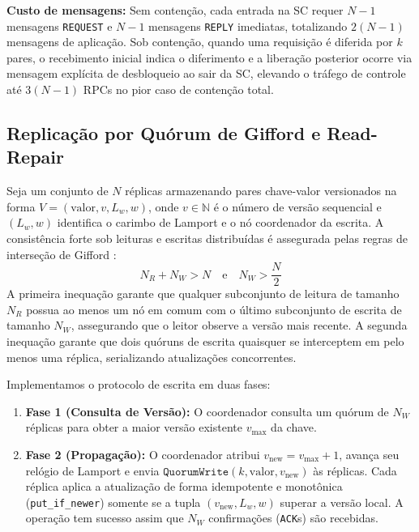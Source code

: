 \documentclass[conference,10pt]{IEEEtran}
\begin{document}
\textbf{Custo de mensagens:} Sem contenção, cada entrada na SC requer $N-1$ mensagens \texttt{REQUEST} e $N-1$ mensagens \texttt{REPLY} imediatas, totalizando $2(N-1)$ mensagens de aplicação. Sob contenção, quando uma requisição é diferida por $k$ pares, o recebimento inicial indica o diferimento e a liberação posterior ocorre via mensagem explícita de desbloqueio ao sair da SC, elevando o tráfego de controle até $3(N-1)$ RPCs no pior caso de contenção total.

\subsection{Replicação por Quórum de Gifford e Read-Repair}

Seja um conjunto de $N$ réplicas armazenando pares chave-valor versionados na forma $V = (\text{valor}, v, L_w, w)$, onde $v \in \mathbb{N}$ é o número de versão sequencial e $(L_w, w)$ identifica o carimbo de Lamport e o nó coordenador da escrita. A consistência forte sob leituras e escritas distribuídas é assegurada pelas regras de interseção de Gifford \cite{gifford1979}:
\begin{equation}
N_R + N_W > N \quad \text{e} \quad N_W > \frac{N}{2}
\label{eq:quorum_rules}
\end{equation}
A primeira inequação garante que qualquer subconjunto de leitura de tamanho $N_R$ possua ao menos um nó em comum com o último subconjunto de escrita de tamanho $N_W$, assegurando que o leitor observe a versão mais recente. A segunda inequação garante que dois quóruns de escrita quaisquer se interceptem em pelo menos uma réplica, serializando atualizações concorrentes.

Implementamos o protocolo de escrita em duas fases:
\begin{enumerate}
    \item \textbf{Fase 1 (Consulta de Versão):} O coordenador consulta um quórum de $N_W$ réplicas para obter a maior versão existente $v_{\max}$ da chave.
    \item \textbf{Fase 2 (Propagação):} O coordenador atribui $v_{\text{new}} = v_{\max} + 1$, avança seu relógio de Lamport e envia $\texttt{QuorumWrite}(k, \text{valor}, v_{\text{new}})$ às réplicas. Cada réplica aplica a atualização de forma idempotente e monotônica (\texttt{put\_if\_newer}) somente se a tupla $(v_{\text{new}}, L_w, w)$ superar a versão local. A operação tem sucesso assim que $N_W$ confirmações (\texttt{ACK}s) são recebidas.
\end{enumerate}
\end{document}
